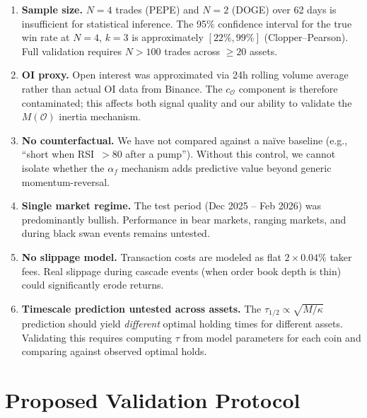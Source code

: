 \documentclass[11pt,a4paper]{article}
\newcommand{\af}{\alpha_f}
\newcommand{\OI}{\mathcal{O}}
\begin{document}
\begin{enumerate}[label=\textbf{L\arabic*.}]
    \item \textbf{Sample size.} $N = 4$ trades (PEPE) and $N = 2$ (DOGE) over 
    62 days is insufficient for statistical inference. The 95\% confidence 
    interval for the true win rate at $N = 4$, $k = 3$ is approximately 
    $[22\%, 99\%]$ (Clopper--Pearson). Full validation requires $N > 100$ 
    trades across $\ge 20$ assets.

    \item \textbf{OI proxy.} Open interest was approximated via 24h rolling 
    volume average rather than actual OI data from Binance. The $c_{\OI}$ 
    component is therefore contaminated; this affects both signal quality and 
    our ability to validate the $M(\OI)$ inertia mechanism.

    \item \textbf{No counterfactual.} We have not compared against a na\"ive 
    baseline (e.g., ``short when RSI~$> 80$ after a pump''). Without this 
    control, we cannot isolate whether the $\af$ mechanism adds predictive 
    value beyond generic momentum-reversal.

    \item \textbf{Single market regime.} The test period (Dec 2025 -- Feb 2026) 
    was predominantly bullish. Performance in bear markets, ranging markets, 
    and during black swan events remains untested.

    \item \textbf{No slippage model.} Transaction costs are modeled as flat 
    $2 \times 0.04\%$ taker fees. Real slippage during cascade events (when 
    order book depth is thin) could significantly erode returns.

    \item \textbf{Timescale prediction untested across assets.} The 
    $\tau_{1/2} \propto \sqrt{M/\kappa}$ prediction should yield 
    \emph{different} optimal holding times for different assets. Validating 
    this requires computing $\tau$ from model parameters for each coin and 
    comparing against observed optimal holds.
\end{enumerate}


\section{Proposed Validation Protocol}
\label{sec:protocol}
\end{document}
